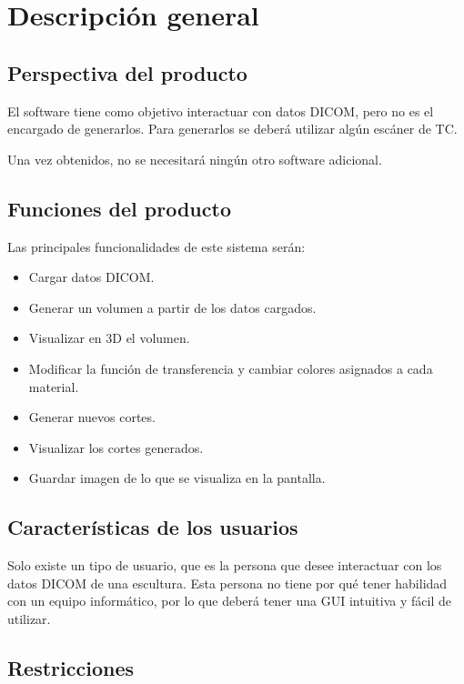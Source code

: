 \section{Descripción general}

\subsection{Perspectiva del producto}

	El software \myTitle tiene como objetivo interactuar con datos DICOM, pero no es el encargado de generarlos. Para generarlos se deberá utilizar algún escáner de TC.
	
	Una vez obtenidos, no se necesitará ningún otro software adicional.
	
	\subsection{Funciones del producto}
	
	Las principales funcionalidades de este sistema serán:
	\begin{itemize}
		\item Cargar datos DICOM.
		\item Generar un volumen a partir de los datos cargados.
		\item Visualizar en 3D el volumen.
		\item Modificar la función de transferencia y cambiar colores asignados a cada material.
		\item Generar nuevos cortes.
		\item Visualizar los cortes generados.
		\item Guardar imagen de lo que se visualiza en la pantalla.
	\end{itemize}
	
	\subsection{Características de los usuarios}
	
	Solo existe un tipo de usuario, que es la persona que desee interactuar con los datos DICOM de una escultura. Esta persona no tiene por qué tener habilidad con un equipo informático, por lo que \myTitle deberá tener una GUI intuitiva y fácil de utilizar.
	
	\subsection{Restricciones}
	
